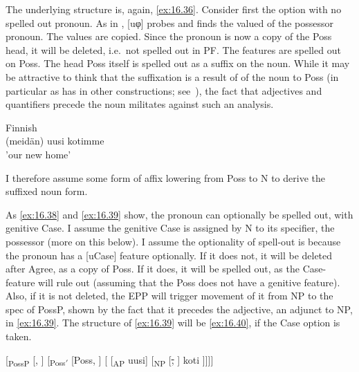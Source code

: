 \documentclass[output=paper]{langsci/langscibook}
\begin{document}
The underlying structure is, again, \eqref{ex:16.36}. Consider first the option with no
spelled out pronoun. As in , [uφ] probes and finds the valued 
of the possessor pronoun. The values are copied. Since the pronoun is now a
copy of the Poss head, it will be deleted, i.e.\ not spelled out in PF. The
features are spelled out on Poss. The head Poss itself is spelled out as a
suffix on the noun. While it may be attractive to think that the suffixation is
a result of  of the noun to Poss (in particular as  has
 in other constructions; see~\citealt{HolmbergEtAl1993}), the fact that
adjectives and quantifiers precede the noun militates against such an analysis.

\ea Finnish\\\label{ex:16.39}
	(meidän) uusi kotimme\\
	'our new home'\\
\z

I therefore assume some form of affix lowering from Poss to N to derive the
suffixed noun form.

As \eqref{ex:16.38} and \eqref{ex:16.39} show, the pronoun can optionally be spelled out, with genitive
Case. I assume the genitive Case is assigned by N to its specifier, the
possessor (more on this below). I assume the optionality of spell-out is
because the pronoun has a [uCase] feature optionally. If it does not, it will
be deleted after Agree, as a copy of Poss. If it does, it will be spelled out,
as the Case-feature will rule out  (assuming that the Poss does
not have a genitive feature).  Also, if it is not deleted, the \gls{EPP} will trigger
movement of it from NP to the spec of PossP, shown by the fact that it precedes
the adjective, an adjunct to NP, in \eqref{ex:16.39}. The structure of \eqref{ex:16.39} will be \eqref{ex:16.40},
if the Case option is taken.

\ea\label{ex:16.40}
    {}[\textsubscript{PossP} [\Fpl{}, \Gen{}] [\textsubscript{Poss$'$}
        [Poss, \Fpl{}] [ [\textsubscript{AP} uusi]
        [\textsubscript{NP} [\sout{\Fpl{}, \Gen{}}] koti ]]]]
\z
\end{document}
